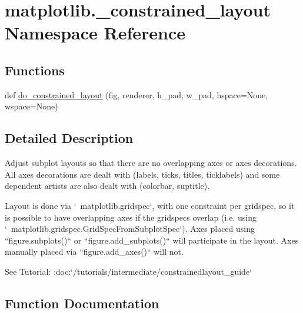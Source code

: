 \hypertarget{namespacematplotlib_1_1__constrained__layout}{}\section{matplotlib.\+\_\+constrained\+\_\+layout Namespace Reference}
\label{namespacematplotlib_1_1__constrained__layout}
\subsection*{Functions}
\begin{DoxyCompactItemize}
\item 
def \hyperlink{namespacematplotlib_1_1__constrained__layout_a5796c10dbfe53aed98d4b4fc693f9a6e}{do\+\_\+constrained\+\_\+layout} (fig, renderer, h\+\_\+pad, w\+\_\+pad, hspace=None, wspace=None)
\end{DoxyCompactItemize}


\subsection{Detailed Description}
\begin{DoxyVerb}Adjust subplot layouts so that there are no overlapping axes or axes
decorations.  All axes decorations are dealt with (labels, ticks, titles,
ticklabels) and some dependent artists are also dealt with (colorbar,
suptitle).

Layout is done via `~matplotlib.gridspec`, with one constraint per gridspec,
so it is possible to have overlapping axes if the gridspecs overlap (i.e.
using `~matplotlib.gridspec.GridSpecFromSubplotSpec`).  Axes placed using
``figure.subplots()`` or ``figure.add_subplots()`` will participate in the
layout.  Axes manually placed via ``figure.add_axes()`` will not.

See Tutorial: :doc:`/tutorials/intermediate/constrainedlayout_guide`
\end{DoxyVerb}
 

\subsection{Function Documentation}
\mbox{\label{namespacematplotlib_1_1__constrained__layout_a5796c10dbfe53aed98d4b4fc693f9a6e}} 
